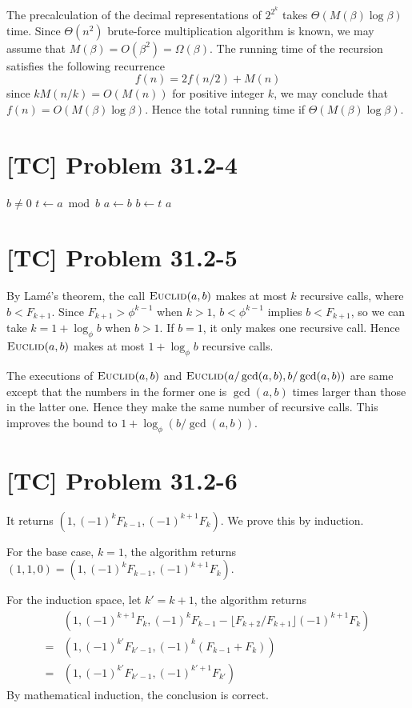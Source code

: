 \documentclass[a4paper,11pt,twocolumn]{article}
\begin{document}
  The precalculation of the decimal representations of $2^{2^k}$ takes $\Theta(M(\beta) \log \beta)$ time. Since $\Theta(n^2)$ brute-force multiplication algorithm is known, we may assume that $M(\beta) = O(\beta^2) = \Omega(\beta)$. The running time of the recursion satisfies the following recurrence
  $$ f(n) = 2f(n/2) + M(n) $$
  since $kM(n/k) = O(M(n))$ for positive integer $k$, we may conclude that $f(n) = O(M(\beta) \log \beta)$. Hence the total running time if $\Theta(M(\beta) \log \beta)$.

  \section{[TC] Problem 31.2-4}
  \begin{codebox}
  \li \While $b \neq 0$
  \li \Do $t \gets a \bmod b$
  \li     $a \gets b$
  \li     $b \gets t$
      \End
  \li \Return $a$
  \end{codebox}
  
  \section{[TC] Problem 31.2-5}
  By Lam\'{e}'s theorem, the call $\textnormal{\scshape Euclid}(a, b)$ makes at most $k$ recursive calls, where $b < F_{k+1}$. Since $F_{k+1} > \phi^{k-1}$ when $k > 1$, $b < \phi^{k-1}$ implies $b < F_{k+1}$, so we can take $k = 1 + \log_{\phi} b$ when $b > 1$. If $b = 1$, it only makes one recursive call. Hence $\textnormal{\scshape Euclid}(a, b)$ makes at most $1 + \log_{\phi} b$ recursive calls.

  The executions of $\textnormal{\scshape Euclid}(a, b)$ and $\textnormal{\scshape Euclid}(a/\gcd(a, b), b/\gcd(a, b))$ are same except that the numbers in the former one is $\gcd(a, b)$ times larger than those in the latter one. Hence they make the same number of recursive calls. This improves the bound to $1 + \log_{\phi}(b/\gcd(a,b))$. 
  
  \section{[TC] Problem 31.2-6}
  It returns $(1, (-1)^k F_{k-1}, (-1)^{k+1} F_k)$. We prove this by induction. \par
  For the base case, $k = 1$, the algorithm returns $(1, 1, 0) = (1, (-1)^k F_{k-1}, (-1)^{k+1} F_k)$. \par
  For the induction space, let $k' = k + 1$, the algorithm returns 
  \begin{align*}
    &(1, (-1)^{k+1} F_k, (-1)^k F_{k-1} - \lfloor F_{k+2} / F_{k+1} \rfloor (-1)^{k+1} F_k) \\
  =& (1, (-1)^{k'} F_{k'-1}, (-1)^k (F_{k-1} + F_k)) \\
  =& (1, (-1)^{k'} F_{k'-1}, (-1)^{k'+1} F_{k'})
  \end{align*}
  By mathematical induction, the conclusion is correct.
  
\end{document}
